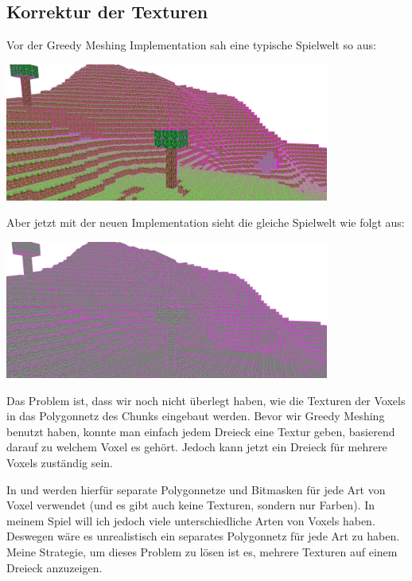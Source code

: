\subsection{Korrektur der Texturen}

Vor der Greedy Meshing Implementation sah eine
typische Spielwelt so aus:

\begin{center}
\includegraphics[width=0.8\textwidth]{../assets/greedy/landscape_normal.png}
\end{center}

Aber jetzt mit der neuen Implementation
sieht die gleiche Spielwelt wie folgt aus:

\begin{center}
\includegraphics[width=0.8\textwidth]{../assets/greedy/landscape_stone_only.png}
\end{center}

Das Problem ist, dass wir noch nicht überlegt haben,
wie die Texturen der Voxels in das Polygonnetz des
Chunks eingebaut werden.
Bevor wir Greedy Meshing benutzt haben, konnte man
einfach jedem Dreieck eine Textur geben, basierend
darauf zu welchem Voxel es gehört.
Jedoch kann jetzt ein Dreieck für mehrere Voxels
zuständig sein.

In \cite{yt_bin_greedy_mesher} und
\cite{gh_bin_greedy_mesher} werden hierfür separate
Polygonnetze und Bitmasken für jede Art von Voxel
verwendet (und es gibt auch keine Texturen, sondern
nur Farben).
In meinem Spiel will ich jedoch viele unterschiedliche
Arten von Voxels haben. Deswegen wäre es unrealistisch
ein separates Polygonnetz für jede Art zu haben.
Meine Strategie, um dieses Problem zu lösen ist es,
mehrere Texturen auf einem Dreieck anzuzeigen.

